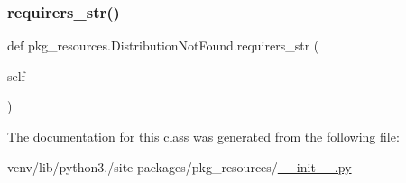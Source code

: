 \mbox{\label{classpkg__resources_1_1DistributionNotFound_a02cc1e7ec9433f9e21ec80848317a5c0}} 
\subsubsection{\texorpdfstring{requirers\+\_\+str()}{requirers\_str()}}
{\footnotesize\ttfamily def pkg\+\_\+resources.\+Distribution\+Not\+Found.\+requirers\+\_\+str (\begin{DoxyParamCaption}\item[{}]{self }\end{DoxyParamCaption})}



The documentation for this class was generated from the following file\+:\begin{DoxyCompactItemize}
\item 
venv/lib/python3./site-\/packages/pkg\+\_\+resources/\hyperlink{venv_2lib_2python3_89_2site-packages_2pkg__resources_2____init_____8py}{\+\_\+\+\_\+init\+\_\+\+\_\+.\+py}\end{DoxyCompactItemize}
